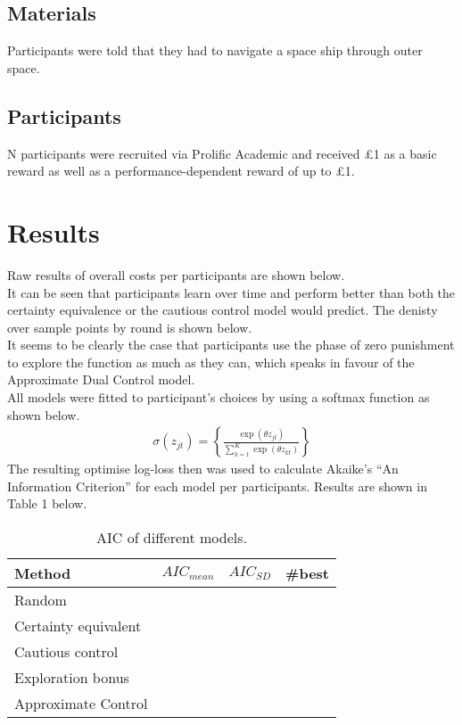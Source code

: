 \documentclass[10pt,letterpaper]{article}
\begin{document}
\subsection{Materials}
Participants were told that they had to navigate a space ship through outer space.

\subsection{Participants}
N participants were recruited via Prolific Academic and received \pounds 1 as a basic reward as well as a performance-dependent reward of up to \pounds 1.
\section{Results}
Raw results of overall costs per participants are shown below.\\

It can be seen that participants learn over time and perform better than both the certainty equivalence or the cautious control model would predict. The denisty over sample points by round is shown below.\\
It seems to be clearly the case that participants use the phase of zero punishment to explore the function as much as they can, which speaks in favour of the Approximate Dual Control model.\\
All models were fitted to participant's choices by using a softmax function as shown below.
\begin{align*}
\label{softmax}
\sigma(z_{jt}) = \left\{\frac{\exp(\theta z_{jt})}{\sum_{k=1}^{K}\exp(\theta z_{kt})}\right\}
\end{align*}
The resulting optimise log-loss then was used to calculate Akaike's ``An Information Criterion'' for each model per participants. Results are shown in Table 1 below.
\begin{table}[h!]
\caption{AIC of different models.}
\label{results}
\begin{tabular}{lccc}
\hline
Method& $AIC_{mean}$ & $AIC_{SD}$ &\#best\\ \hline
Random&&\\
Certainty equivalent &&\\
Cautious control&&\\
Exploration bonus&&\\
Approximate Control&&
\end{tabular}
\end{table}
\end{document}
